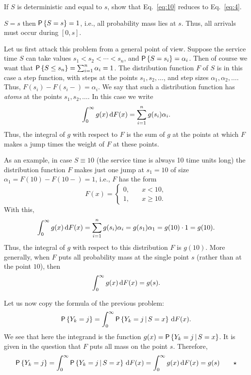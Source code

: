 \begin{exercise}
  If $S$ is deterministic and equal to $s$, show that
  Eq.~\eqref{eq:10} reduces to Eq.~\eqref{eq:4}.  
  \begin{hint}
 $S=s$ then
    $\P{S=s}=1$, i.e., all probability mass lies at $s$. Thus, all
    arrivals must occur during $[0,s]$.
  \end{hint}
  \begin{solution}
    Let us first attack this problem from a general point of
    view. Suppose the service time $S$ can take values
    $s_1<s_2<\cdots <s_n$, and $\P{S=s_i}=\alpha_i$. Then of course we
    want that $\P{S\leq s_n} = \sum_{i=1}^n \alpha_i = 1$. The
    distribution function $F$ of $S$ is in this case a step function,
    with steps at the points $s_1, s_2, \ldots$, and step sizes
    $\alpha_1, \alpha_2, \ldots$. Thus, $F(s_i)-F(s_i-)=\alpha_i$. We
    say that such a distribution function has \emph{atoms} at the
    points $s_1, s_2, \ldots$. In this case we write
  \begin{equation*}
    \int_0^\infty g(x) \,\text{d}F(x) = \sum_{i=1}^n g(s_i) \alpha_i.
  \end{equation*}
  Thus, the integral of $g$ with respect to $F$ is the sum of $g$ at
  the points at which $F$ makes a jump times the weight of $F$ at
  these points. 

  As an example, in case $S\equiv 10$ (the service time is always 10
  time units long) the distribution function $F$ makes just one jump
  at $s_1=10$ of size $\alpha_1 = F(10)-F(10-) =1$, i.e., $F$ has the
  form
    \begin{equation*}
      F(x) = 
      \begin{cases}
        0, &\quad x< 10, \\
        1, &\quad x\geq 10.
      \end{cases}
    \end{equation*}
With this, 
\begin{equation*}
  \int_0^\infty g(x) \,\text{d}F(x) = \sum_{i=1}^n g(s_i) \alpha_i = g(s_1) \alpha_1 = g(10) \cdot 1 = g(10).
\end{equation*}
Thus, the integral of $g$ with respect to this distribution $F$ is
$g(10)$.  More generally, when $F$ puts all probability mass at the
single point $s$ (rather than at the point $10$), then
\begin{equation*}
  \int_0^\infty g(x) \,\text{d}F(x) = g(s).
\end{equation*}

    Let us now copy the formula of the previous problem:
    \begin{equation*}
    \P{Y_k=j} = \int_0^\infty \P{Y_k =j\given S=x} \d F(x).
    \end{equation*}
    We see that here the integrand is the function
    $g(x) = \P{Y_k=j\given S=x}$. It is given in the question that $F$
    puts all mass on the point $s$. Therefore,
    \begin{equation*}
    \P{Y_k=j} = \int_0^\infty \P{Y_k =j\given S=x} \d F(x) = 
\int_0^\infty g(x) \d F(x) = g(s) \qquad \star
    \end{equation*}


\end{solution}
\end{exercise}
